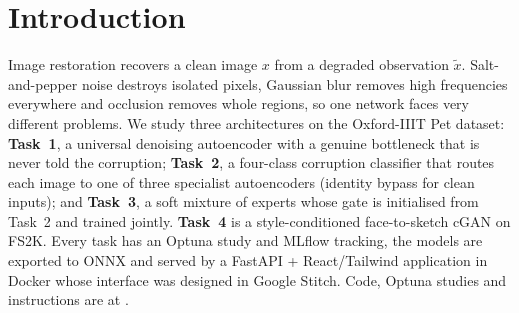\section{Introduction}
Image restoration recovers a clean image $x$ from a degraded observation $\tilde{x}$. Salt-and-pepper noise destroys isolated pixels, Gaussian blur removes high frequencies everywhere and occlusion removes whole regions, so one network faces very different problems. We study three architectures on the Oxford-IIIT Pet dataset: \textbf{Task~1}, a universal denoising autoencoder with a genuine bottleneck that is never told the corruption; \textbf{Task~2}, a four-class corruption classifier that routes each image to one of three specialist autoencoders (identity bypass for clean inputs); and \textbf{Task~3}, a soft mixture of experts whose gate is initialised from Task~2 and trained jointly. \textbf{Task~4} is a style-conditioned face-to-sketch cGAN on FS2K. Every task has an Optuna study and MLflow tracking, the models are exported to ONNX and served by a FastAPI + React/Tailwind application in Docker whose interface was designed in Google Stitch. Code, Optuna studies and instructions are at \repo.
